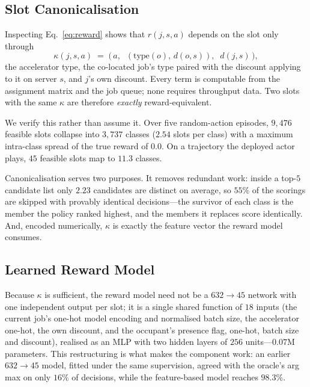 \documentclass{article}
\begin{document}
\subsection{Slot Canonicalisation}
\label{sec:canon}

Inspecting Eq.~\eqref{eq:reward} shows that $r(j,s,a)$ depends on the slot only
through
\begin{equation}
\kappa(j,s,a) \;=\; \bigl(\,a,\;\; (\text{type}(o),\, d(o,s)),\;\; d(j,s)\,\bigr),
\label{eq:key}
\end{equation}
the accelerator type, the co-located job's type paired with the discount applying
to it on server $s$, and $j$'s own discount. Every term is computable from the
assignment matrix and the job queue; none requires throughput data. Two slots with
the same $\kappa$ are therefore \emph{exactly} reward-equivalent.

We verify this rather than assume it. Over five random-action episodes, $9{,}476$
feasible slots collapse into $3{,}737$ classes ($2.54$ slots per class) with a
maximum intra-class spread of the true reward of $0.0$. On a trajectory the
deployed actor plays, $45$ feasible slots map to $11.3$ classes.

Canonicalisation serves two purposes. It removes redundant work: inside a top-$5$
candidate list only $2.23$ candidates are distinct on average, so $55\%$ of the
scorings are skipped with provably identical decisions---the survivor of each class
is the member the policy ranked highest, and the members it replaces score
identically. And, encoded numerically, $\kappa$ is exactly the feature vector the
reward model consumes.

\subsection{Learned Reward Model}
\label{sec:reward}

Because $\kappa$ is sufficient, the reward model need not be a
$632 \rightarrow 45$ network with one independent output per slot; it is a single
shared function of $18$ inputs (the current job's one-hot model encoding and
normalised batch size, the accelerator one-hot, the own discount, and the
occupant's presence flag, one-hot, batch size and discount), realised as an MLP
with two hidden layers of $256$ units---$0.07$M parameters. This restructuring is
what makes the component work: an earlier $632 \rightarrow 45$ model, fitted under
the same supervision, agreed with the oracle's arg\,max on only $16\%$ of
decisions, while the feature-based model reaches $98.3\%$.
\end{document}
